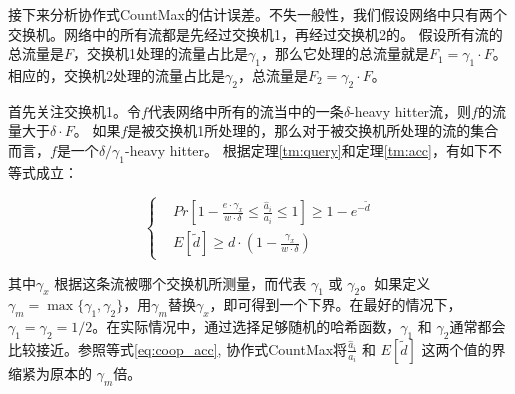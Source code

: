 接下来分析协作式CountMax的估计误差。不失一般性，我们假设网络中只有两个交换机。网络中的所有流都是先经过交换机1，再经过交换机2的。
假设所有流的总流量是$F$，交换机1处理的流量占比是$\gamma_1 $，那么它处理的总流量就是$F_1 =\gamma_1\cdot F $。
相应的，交换机2处理的流量占比是$\gamma_2 $，总流量是$F_2 =\gamma_2\cdot F $。

首先关注交换机1。令$f$代表网络中所有的流当中的一条$\delta$-heavy hitter流，则$f$的流量大于$\delta \cdot F$。
如果$f$是被交换机1所处理的，那么对于被交换机所处理的流的集合而言，$f$是一个$\delta/\gamma_1$-heavy hitter。
根据定理\ref{tm:query}和定理\ref{tm:acc}，有如下不等式成立：

\begin{equation}\label{eq:coop_acc}
\left\{
\begin{aligned}
&Pr[1-\frac{e\cdot \gamma_x}{w\cdot \delta}\le \frac{\hat{a}_i}{a_i} \le 1] \ge 1-e^{-\tilde{d}}\\
&E[\tilde{d}]\ge d\cdot(1-\frac{\gamma_x}{w\cdot\delta})
\end{aligned}
\right.
\end{equation}

其中$\gamma_x$ 根据这条流被哪个交换机所测量，而代表 $\gamma_1$ 或 $\gamma_2$。如果定义 $\gamma_m = \max \{\gamma_1, \gamma_2\}$，用$\gamma_m$替换$\gamma_x$，即可得到一个下界。在最好的情况下，$\gamma_1=\gamma_2=1/2$。在实际情况中，通过选择足够随机的哈希函数，$\gamma_1$ 和 $\gamma_2$通常都会比较接近。参照等式\eqref{eq:coop_acc}, 协作式CountMax将$\frac{\hat{a}_i}{a_i}$ 和 $E[\tilde{d}]$ 这两个值的界缩紧为原本的 $\gamma_m $倍。








